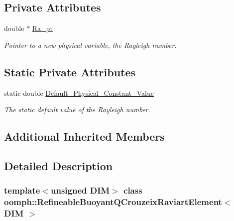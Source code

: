 \subsection*{Private Attributes}
\begin{DoxyCompactItemize}
\item 
double $\ast$ \hyperlink{classoomph_1_1RefineableBuoyantQCrouzeixRaviartElement_a65ce0c55087be240fc183e08def8b07b}{Ra\+\_\+pt}
\begin{DoxyCompactList}\small\item\em Pointer to a new physical variable, the Rayleigh number. \end{DoxyCompactList}\end{DoxyCompactItemize}
\subsection*{Static Private Attributes}
\begin{DoxyCompactItemize}
\item 
static double \hyperlink{classoomph_1_1RefineableBuoyantQCrouzeixRaviartElement_a33bf1cb8ad42fc6418e71acabbe1925e}{Default\+\_\+\+Physical\+\_\+\+Constant\+\_\+\+Value}
\begin{DoxyCompactList}\small\item\em The static default value of the Rayleigh number. \end{DoxyCompactList}\end{DoxyCompactItemize}
\subsection*{Additional Inherited Members}


\subsection{Detailed Description}
\subsubsection*{template$<$unsigned D\+IM$>$\newline
class oomph\+::\+Refineable\+Buoyant\+Q\+Crouzeix\+Raviart\+Element$<$ D\+I\+M $>$}

